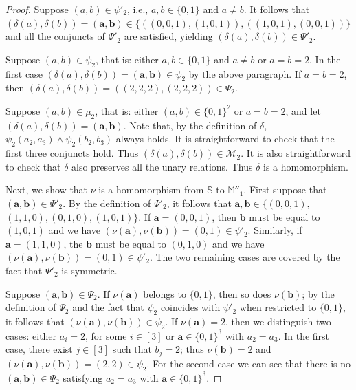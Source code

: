 \documentclass[12pt]{amsart}
\theoremstyle{definition}
\theoremstyle{definition}
\newcommand{\struct}[1]{\mathbb{#1}}
\begin{document}
\begin{proof}
Suppose $(a,b)\in\psi'_2$, i.e., $a,b\in\{0,1\}$ and $a\neq b$. It follows that $(\delta(a),\delta(b)) = (\boldsymbol{a}, \boldsymbol{b})\in\{((0,0,1),(1,0,1)),((1,0,1),(0,0,1))\}$ and all the conjuncts of $\Psi'_2$ are satisfied, yielding $(\delta(a),\delta(b))\in\Psi'_2$.

Suppose $(a,b)\in\psi_2$, that is: either $a,b\in\{0,1\}$ and $a\neq b$ or $a=b=2$. In the first case $(\delta(a),\delta(b)) = (\boldsymbol{a}, \boldsymbol{b}) \in \psi_2$ by the above paragraph. If $a=b=2$, then $(\delta(a),\delta(b))=((2,2,2),(2,2,2)) \in \Psi_2$.

Suppose $(a,b)\in\mu_2$, that is: either $(a,b)\in\{0,1\}^2$ or $a=b=2$, and let $(\delta(a),\delta(b)) = (\boldsymbol{a}, \boldsymbol{b})$. Note that, by the definition of $\delta$, $\psi_2(a_2,a_3)\wedge\psi_2(b_2,b_3)$ always holds. It is straightforward to check that the first three conjuncts hold. Thus $(\delta(a),\delta(b))\in \mathcal M_2$. It is also straightforward to check that $\delta$ also preserves all the unary relations. Thus $\delta$ is a homomorphism.

Next, we show that $\nu$ is a homomorphism from $\struct{S}$ to $\struct{M}''_1$. First suppose that $(\boldsymbol{a},\boldsymbol{b})\in\Psi'_2$. By the definition of $\Psi'_2$, it follows that $\boldsymbol{a},\boldsymbol{b}\in\{(0,0,1),$ $(1,1,0),(0,1,0), (1,0,1)\}$. If $\boldsymbol{a}=(0,0,1)$, then $\boldsymbol{b}$ must be equal to $(1,0,1)$ and we have $(\nu(\boldsymbol{a}),\nu(\boldsymbol{b}))=(0,1)\in\psi'_2$. Similarly, if $\boldsymbol{a}=(1,1,0)$, the $\boldsymbol{b}$ must be equal to $(0,1,0)$ and we have $(\nu(\boldsymbol{a}),\nu(\boldsymbol{b}))=(0,1)\in\psi'_2$. The two remaining cases are covered by the fact that $\Psi'_2$ is symmetric.

Suppose $(\boldsymbol{a},\boldsymbol{b})\in\Psi_2$. If $\nu(\boldsymbol{a})$ belongs to $\{0,1\}$, then so does $\nu(\boldsymbol{b})$; by the definition of $\Psi_2$ and the fact that $\psi_2$ coincides with $\psi'_2$ when restricted to $\{0,1\}$, it follows that $(\nu(\boldsymbol{a}),\nu(\boldsymbol{b}))\in\psi_2$. If $\nu(\boldsymbol{a})=2$, then we distinguish two cases: either $a_i=2$, for some $i\in[3]$ or $\boldsymbol{a}\in\{0,1\}^3$ with $a_2=a_3$. In the first case, there exist $j\in[3]$ such that $b_j=2$; thus $\nu(\boldsymbol{b})=2$ and $(\nu(\boldsymbol{a}),\nu(\boldsymbol{b}))=(2,2)\in\psi_2$. For the second case we can see that there is no $(\boldsymbol{a},\boldsymbol{b})\in\Psi_2$ satisfying $a_2 = a_3$ with $\boldsymbol{a}\in\{0,1\}^3$. 


\end{proof}
\end{document}
